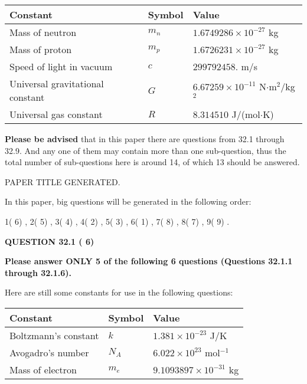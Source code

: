 \documentclass[12pt]{article}
\begin{document}
 
\noindent\begin{tabular}{|l|l|l|}
\hline
Constant & Symbol & Value \\
\hline
Mass of neutron &
$m_n$ &
 $ 1.6749286 \times 10^{-27} $
kg \\
\hline
Mass of proton &
$m_p$ &
 $ 1.6726231 \times 10^{-27} $
kg \\
\hline
Speed of light in vacuum &
$c$ &
 $ 299792458. $
m/s \\
\hline
Universal gravitational constant &
$G$ &
 $ 6.67259 \times 10^{-11} $
N$\cdot $m$^2$/kg$^2$ \\
\hline
Universal gas constant &
$R$ &
 $ 8.314510 $
J/(mol$\cdot $K) \\
\hline
\end{tabular}
 
 
{\textbf{\large{Please be advised}}} that in this paper there are questions from
32.1 through
32.9.
And any one of them may contain more than one sub-question, thus the total number
of sub-questions here is around 14, of which
13 should be answered.
 
\vspace{0.3in}
 
 
   
   
 PAPER TITLE GENERATED.
   
   
   
\vspace{0.2in}
   
In this paper, big questions will be generated in the following order: 
   
   
            1(          6)
 ,
            2(          5)
 ,
            3(          4)
 ,
            4(          2)
 ,
            5(          3)
 ,
            6(          1)
 ,
            7(          8)
 ,
            8(          7)
 ,
            9(          9)
 .
  
\vspace{0.2in}
  
{\textbf{\Large{QUESTION
32.1 
 (          6)
}}}
  
  
 
{\textbf{\Large{Please answer ONLY
5 of the following
6 questions (Questions
32.1.1 through
32.1.6). }}}
 
Here are still some constants for use in the following questions:
 
 
\noindent\begin{tabular}{|l|l|l|}
\hline
Constant & Symbol & Value \\
\hline
 
Boltzmann's constant &
$k$ &
 $ 1.381 \times 10^{-23} $
J/K \\
\hline
 
Avogadro's number &
$N_A$ &
 $ 6.022 \times 10^{23} $
mol$^{-1}$ \\
\hline
 
Mass of electron &
$m_e$ &
 $ 9.1093897 \times 10^{-31} $
kg \\
\hline
 
\end{tabular}
 
\end{document}
